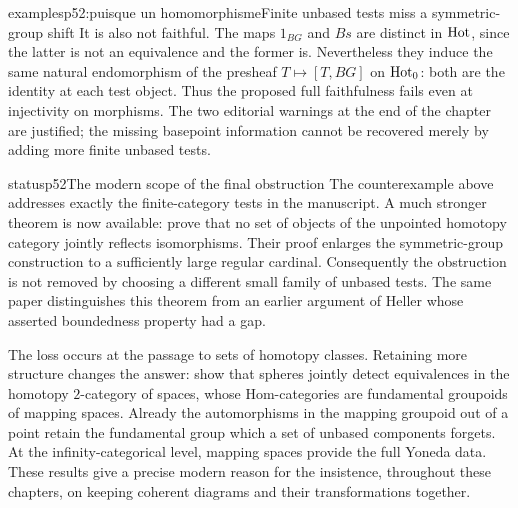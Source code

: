 \begin{dcomment}{examples}{p52:puisque un homomorphisme}{Finite unbased tests miss a symmetric-group shift}
It is also not faithful. The maps $1_{BG}$ and $Bs$ are distinct in $\mathrm{Hot}$, since the latter is not an equivalence and the former is. Nevertheless they induce the same natural endomorphism of the presheaf $T\mapsto[T,BG]$ on $\mathrm{Hot}_0$: both are the identity at each test object. Thus the proposed full faithfulness fails even at injectivity on morphisms. The two editorial warnings at the end of the chapter are justified; the missing basepoint information cannot be recovered merely by adding more finite unbased tests.
\end{dcomment}


\begin{dcomment}{status}{p52}{The modern scope of the final obstruction}
The counterexample above addresses exactly the finite-category tests in the manuscript. A much stronger theorem is now available: \citet[Theorem~2.1]{ArlinChristensen2023} prove that no set of objects of the unpointed homotopy category jointly reflects isomorphisms. Their proof enlarges the symmetric-group construction to a sufficiently large regular cardinal. Consequently the obstruction is not removed by choosing a different small family of unbased tests. The same paper distinguishes this theorem from an earlier argument of Heller whose asserted boundedness property had a gap.

The loss occurs at the passage to sets of homotopy classes. Retaining more structure changes the answer: \citet[Theorem~4.3]{ArlinChristensen2023} show that spheres jointly detect equivalences in the homotopy $2$-category of spaces, whose Hom-categories are fundamental groupoids of mapping spaces. Already the automorphisms in the mapping groupoid out of a point retain the fundamental group which a set of unbased components forgets. At the infinity-categorical level, mapping spaces provide the full Yoneda data. These results give a precise modern reason for the insistence, throughout these chapters, on keeping coherent diagrams and their transformations together.
\end{dcomment}
